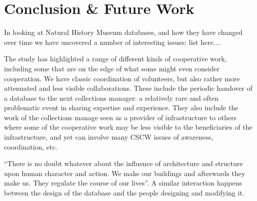 \section{Conclusion & Future Work}
In looking at Natural History Museum databases, and how they have changed over time we have uncovered a number of interesting issues:
list here....

The study has highlighted a range of different kinds of cooperative work, including some that are on the edge of what some might even consider cooperation. We have classic coordination of volunteers, but also rather more attenuated and less visible collaborations. These include the periodic handover of a database to the next collections manager: a relatively rare and often problematic event in sharing expertise and experience. They also include the work of the collections manage seen as a provider of infrastructure to others where some of the cooperative work may be less visible to the beneficiaries of the infrastructure, and yet can involve many CSCW issues of awareness, coordination, etc.

 “There is no doubt whatever about the influence of architecture and structure upon human character and action. We make our buildings and afterwards they make us. They regulate the course of our lives”. A similar interaction happens between the design of the database and the people designing and modifying it.